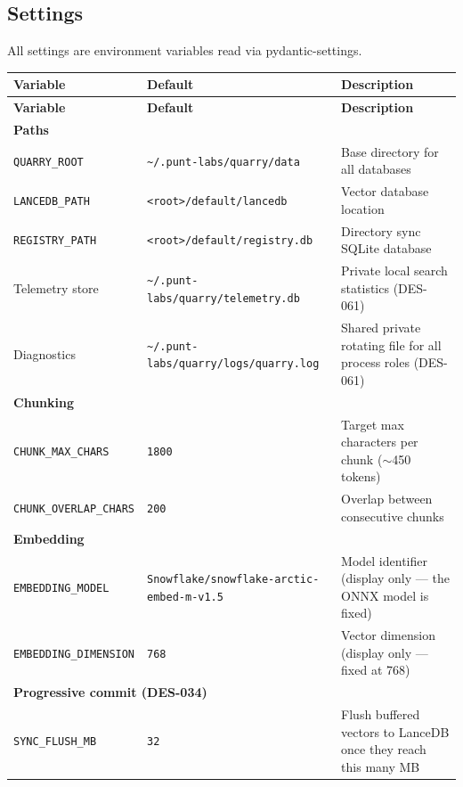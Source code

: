 \documentclass[a4paper,10pt]{article}
\begin{document}
\subsection{Settings}

All settings are environment variables read via pydantic-settings.

\begin{center}
\small
\setlength{\tabcolsep}{4pt}
\begin{longtable}{llp{6.5cm}}
\toprule
\textbf{Variable} & \textbf{Default} & \textbf{Description} \\
\midrule
\endfirsthead
\toprule
\textbf{Variable} & \textbf{Default} & \textbf{Description} \\
\midrule
\endhead
\multicolumn{3}{l}{\textbf{Paths}} \\
\midrule
\texttt{QUARRY\_ROOT}    & \texttt{\~{}/.punt-labs/quarry/data} &
  Base directory for all databases \\
\texttt{LANCEDB\_PATH}   & \texttt{<root>/default/lancedb} &
  Vector database location \\
\texttt{REGISTRY\_PATH}  & \texttt{<root>/default/registry.db} &
  Directory sync SQLite database \\
Telemetry store & \texttt{\~{}/.punt-labs/quarry/telemetry.db} &
  Private local search statistics (DES-061) \\
Diagnostics & \texttt{\~{}/.punt-labs/quarry/logs/quarry.log} &
  Shared private rotating file for all process roles (DES-061) \\
\midrule
\multicolumn{3}{l}{\textbf{Chunking}} \\
\midrule
\texttt{CHUNK\_MAX\_CHARS}     & \texttt{1800} &
  Target max characters per chunk ($\sim$450 tokens) \\
\texttt{CHUNK\_OVERLAP\_CHARS} & \texttt{200} &
  Overlap between consecutive chunks \\
\midrule
\multicolumn{3}{l}{\textbf{Embedding}} \\
\midrule
\texttt{EMBEDDING\_MODEL}     & \texttt{Snowflake/\allowbreak snowflake-arctic-embed-m-v1.5} &
  Model identifier (display only --- the ONNX model is fixed) \\
\texttt{EMBEDDING\_DIMENSION} & \texttt{768} &
  Vector dimension (display only --- fixed at 768) \\
\midrule
\multicolumn{3}{l}{\textbf{Progressive commit (DES-034)}} \\
\midrule
\texttt{SYNC\_FLUSH\_MB}       & \texttt{32} &
  Flush buffered vectors to LanceDB once they reach this many MB

\end{longtable}
\end{center}
\end{document}

